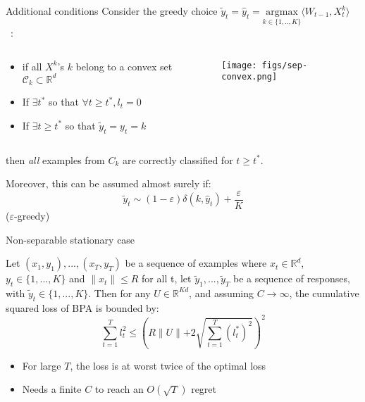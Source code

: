 \documentclass{beamer}
\begin{document}
\begin{frame}{Additional conditions}
	Consider the greedy choice $\tilde{y}_t = \hat{y}_t = \underset{k \in\{1,..,K\}}{\text{argmax}}  \langle W_{t-1}, X_t^k \rangle$ ~:
	\begin{columns}
		\begin{column}{.74\linewidth}
			\begin{itemize}
				\item if all $X^k$'s $k$ belong to a convex set $\mathcal{C}_k \subset \mathbb{R}^d$
				\item If $\exists t^*$ so that $\forall t \geq t^*, l_t =0$
				\item If $\exists t \geq t^*$ so that $\tilde{y}_t = y_t = k$
			\end{itemize}
		\end{column}
		\begin{column}{.24\linewidth}
			\texttt{[image: figs/sep-convex.png]}
		\end{column}
	\end{columns}
	
	then \textit{all} examples from $C_k$ are correctly classified for $t \geq t^*$.
	\vspace{.5cm}
	
	Moreover, this can be assumed almost surely if: 
	$$\tilde{y}_t \sim (1-\varepsilon) \delta(k,\hat{y}_t) + \frac{\varepsilon}{K} $$
	($\varepsilon$-greedy)
\end{frame}

\begin{frame}{Non-separable stationary case}
	\begin{footnotesize}
	\begin{theorem}

		Let $(x_1,y_1),...,(x_T,y_T)$ be a sequence of examples where $x_t \in \mathbb{R}^d$, $y_t\in \{1,...,K\}$ and $\parallel x_t \parallel\leqslant R$ for all t, let $\tilde{y}_1,...,\tilde{y}_T$ be a sequence of responses, with $\tilde{y}_t\in \{1,...,K\}$. Then for any  $U \in \mathbb{R}^{K d}$, and assuming $C \rightarrow \infty$, the cumulative squared loss of BPA is bounded by:
		\[\sum_{t=1}^{T}l_t^2 \leqslant \left(R\parallel{U}\parallel+2 \sqrt{\sum_{t=1}^{T}(l_t^{\ast})^2}\right)^2 \]
	\end{theorem}

	\begin{alertblock}{}
		\begin{itemize}
			\item For large $T$, the loss is at worst twice of the optimal loss 
			\item Needs a finite $C$ to reach an $O(\sqrt{T})$ regret
		\end{itemize}
	\end{alertblock}
	\end{footnotesize}
\end{frame}
\end{document}
